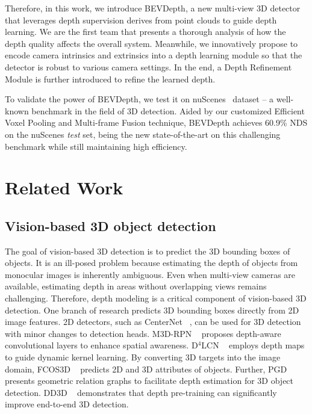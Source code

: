 \documentclass[twocolumn,letterpaper]{article}
\begin{document}
Therefore, in this work, we introduce BEVDepth, a new multi-view 3D detector that leverages depth supervision derives from point clouds to guide depth learning. We are the first team that presents a thorough analysis of how the depth quality affects the overall system. Meanwhile, we innovatively propose to encode camera intrinsics and extrinsics into a depth learning module so that the detector is robust to various camera settings. In the end, a Depth Refinement Module is further introduced to refine the learned depth. 

To validate the power of BEVDepth, we test it on nuScenes~\cite{caesar2020nuscenes} dataset -- a well-known benchmark in the field of 3D detection. Aided by our customized Efficient Voxel Pooling and Multi-frame Fusion technique, BEVDepth achieves 60.9\% NDS on the nuScenes \emph{test} set, being the new state-of-the-art on this challenging benchmark while still maintaining high efficiency.


\section{Related Work} \label{rworks}
\subsection{Vision-based 3D object detection}
The goal of vision-based 3D detection is to predict the 3D bounding boxes of objects. It is an ill-posed problem because estimating the depth of objects from monocular images is inherently ambiguous. Even when multi-view cameras are available, estimating depth in areas without overlapping views remains challenging. Therefore, depth modeling is a critical component of vision-based 3D detection. One branch of research predicts 3D bounding boxes directly from 2D image features. 2D detectors, such as CenterNet ~\cite{zhou2019objects}, can be used for 3D detection with minor changes to detection heads. M3D-RPN ~\cite{brazil2019m3d} proposes depth-aware convolutional layers to enhance spatial awareness. D$^4$LCN ~\cite{huo2020learning} employs depth maps to guide dynamic kernel learning. By converting 3D targets into the image domain, FCOS3D ~\cite{wang2021fcos3d} predicts 2D and 3D attributes of objects. Further, PGD ~\cite{wang2022probabilistic} presents geometric relation graphs to facilitate depth estimation for 3D object detection. DD3D ~\cite{park2021pseudo} demonstrates that depth pre-training can significantly improve end-to-end 3D detection.
\end{document}
